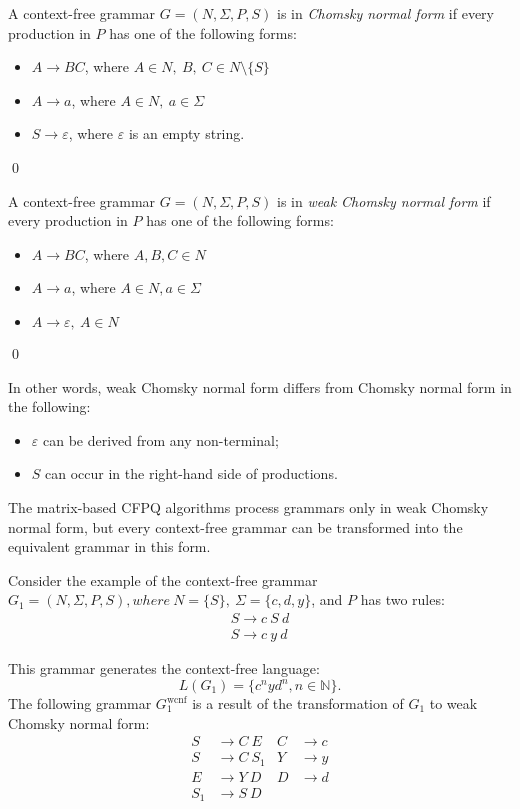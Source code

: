 \begin{definition} A context-free grammar $G = (N, \Sigma, P, S)$ is in \emph{Chomsky normal form} if every production in $P$ has one of the following forms:
    \begin{itemize}
        \item $A \rightarrow BC$, where $A \in N,~B,~C \in N \setminus \{S\}$
        \item  $A \rightarrow a$, where $A \in N,~a \in \Sigma$
        \item $S \rightarrow \varepsilon$, where $\varepsilon$ is an empty string.
    \end{itemize}\qed
\end{definition}

\begin{definition} A context-free grammar $G = (N, \Sigma, P, S)$ is in \emph{weak Chomsky normal form} if every production in $P$ has one of the following forms:
    \begin{itemize}
        \item $A \rightarrow BC$, where $A, B, C \in N$
        \item  $A \rightarrow a$, where $A \in N, a \in \Sigma$
        \item $A \rightarrow \varepsilon,~A \in N$
    \end{itemize} \qed
\end{definition}

In other words, weak Chomsky normal form differs from Chomsky normal form in the following:
\begin{itemize}
    \item $\varepsilon$ can be derived from any non-terminal;
    \item $S$ can occur in the right-hand side of productions.
\end{itemize}

The matrix-based CFPQ algorithms process grammars only in weak Chomsky normal form, but every context-free grammar can be transformed into the equivalent grammar in this form.

Consider the example of the context-free grammar $G_1=(N, \Sigma, P, S), where ~N=\{S\},~\Sigma=\{c, d, y\}$, and $P$ has two rules:
\begin{align}
\label{eqn:g1_example}
S \rightarrow c \ S \ d \nonumber\\
S \rightarrow c \ y \ d
\end{align}

This grammar generates the context-free language: $$L(G_1) = \{c^nyd^n, n \in \mathbb{N}\}.$$
The following grammar $G_1^{\text{wcnf}}$ is a result of the transformation of $G_1$ to weak Chomsky normal form:
\begin{align*}
S& \to C \ E   & C& \to c   \\
S& \to C \ S_1 & Y& \to y   \\
E& \to Y \ D   & D& \to d   \\
S_1& \to S \ D &&
\end{align*}


